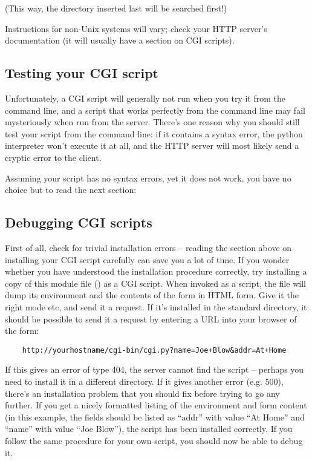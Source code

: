 (This way, the directory inserted last will be searched first!)

Instructions for non-Unix systems will vary; check your HTTP server's
documentation (it will usually have a section on CGI scripts).


\subsection{Testing your CGI script}

Unfortunately, a CGI script will generally not run when you try it
from the command line, and a script that works perfectly from the
command line may fail mysteriously when run from the server.  There's
one reason why you should still test your script from the command
line: if it contains a syntax error, the python interpreter won't
execute it at all, and the HTTP server will most likely send a cryptic
error to the client.

Assuming your script has no syntax errors, yet it does not work, you
have no choice but to read the next section:


\subsection{Debugging CGI scripts}

First of all, check for trivial installation errors -- reading the
section above on installing your CGI script carefully can save you a
lot of time.  If you wonder whether you have understood the
installation procedure correctly, try installing a copy of this module
file () as a CGI script.  When invoked as a script, the file
will dump its environment and the contents of the form in HTML form.
Give it the right mode etc, and send it a request.  If it's installed
in the standard  directory, it should be possible to send it a
request by entering a URL into your browser of the form:

\begin{verbatim}
	http://yourhostname/cgi-bin/cgi.py?name=Joe+Blow&addr=At+Home
\end{verbatim}

If this gives an error of type 404, the server cannot find the script
-- perhaps you need to install it in a different directory.  If it
gives another error (e.g.  500), there's an installation problem that
you should fix before trying to go any further.  If you get a nicely
formatted listing of the environment and form content (in this
example, the fields should be listed as ``addr'' with value ``At Home''
and ``name'' with value ``Joe Blow''), the  script has been
installed correctly.  If you follow the same procedure for your own
script, you should now be able to debug it.

